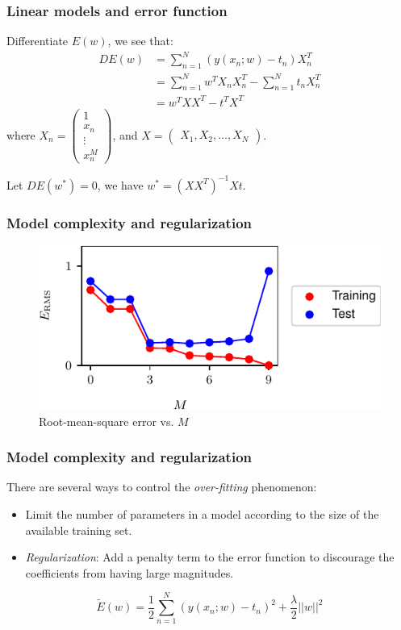 \documentclass{beamer}
\begin{document}
\begin{frame}
    \frametitle{Linear models and error function}
    Differentiate $E(w)$, we see that:
    \begin{equation*}
        \begin{split}
            DE(w)&=\sum_{n=1}^{N}(y(x_{n};w)-t_{n})X_{n}^{T} \\
            &=\sum_{n=1}^{N}w^{T}X_{n}X_{n}^{T}-\sum_{n=1}^{N}t_{n}X_{n}^{T} \\
            &=w^{T}XX^{T}-t^{T}X^{T}
        \end{split}
    \end{equation*}
    where $X_{n}=\begin{pmatrix}
        1 \\
        x_{n} \\
        \vdots \\
        x_{n}^{M}
    \end{pmatrix}$, and $X=\begin{pmatrix}
        X_{1},X_{2},\hdots,X_{N}
    \end{pmatrix}$.
    
    Let $DE(w^{*})=0$, we have $w^{*}=(XX^{T})^{-1}Xt$.
\end{frame}

\begin{frame}
    \frametitle{Model complexity and regularization}
    \begin{figure}
        \caption{Root-mean-square error vs. $M$}
        \includegraphics{Figure_7.pdf}
    \end{figure}
\end{frame}

\begin{frame}
    \frametitle{Model complexity and regularization}
    There are several ways to control the \emph{over-fitting} phenomenon:
    \begin{itemize}
        \item Limit the number of parameters in a model according to the size of the available training set.
        \item \emph{Regularization}: Add a penalty term to the error function to discourage the coefficients from having large magnitudes.
    \end{itemize}
    \begin{equation*}
        \tilde{E}(w)=\frac{1}{2}\sum_{n=1}^{N}(y(x_{n};w)-t_{n})^{2}+\frac{\lambda}{2}||w||^{2}
    \end{equation*}
\end{frame}
\end{document}
